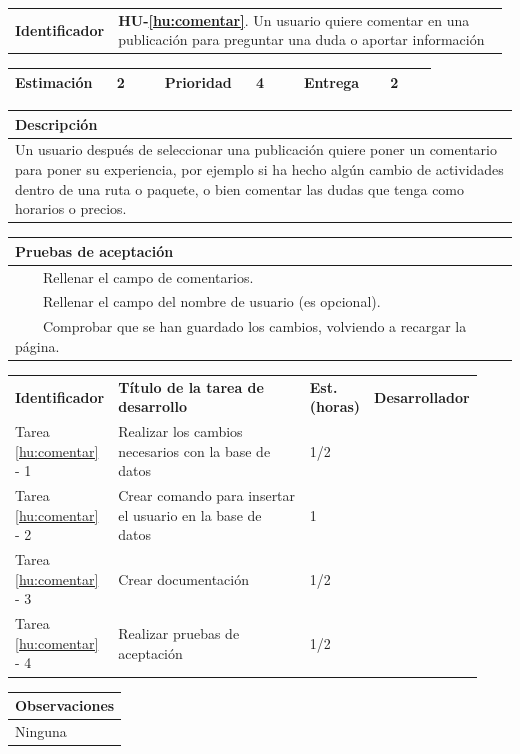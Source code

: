 \documentclass[11pt]{article}
\newcommand{\tabitem}{~~\llap{\textbullet}~~}
\begin{document}
\begin{longtable}{p{0.18\linewidth}|p{0.8\linewidth}}
  \rowcolor{LightCyan}
  \textbf{Identificador} & \textbf{HU-\ref{hu:comentar}}. Un usuario quiere comentar en una publicación para preguntar una duda o aportar información \\  
\end{longtable}
\vspace{-0.8cm}
\begin{longtable}{p{0.18\linewidth}|p{0.1\linewidth}|p{0.18\linewidth}|p{0.1\linewidth}|p{0.18\linewidth}|p{0.1\linewidth}}
  \toprule
  \textbf{Estimación} & 2 & \textbf{Prioridad} & 4 & \textbf{Entrega} & 2 \\
  \bottomrule
\end{longtable}
\vspace{-0.8cm}
\begin{longtable}{p{1.028\linewidth}}
  \textbf{Descripción}\\
  \midrule
  Un usuario después de seleccionar una publicación quiere poner un comentario para poner su experiencia, por ejemplo si ha hecho algún cambio de actividades dentro de una ruta o paquete, o bien comentar las dudas que tenga como horarios o precios. \\
  \bottomrule
\end{longtable}
\vspace{-0.8cm}
\begin{longtable}{p{1.028\linewidth}}
  \textbf{Pruebas de aceptación}\\
  \midrule
  \tabitem Rellenar el campo de comentarios.\\
  \tabitem Rellenar el campo del nombre de usuario (es opcional).\\
  \tabitem Comprobar que se han guardado los cambios, volviendo a recargar la página.\\
\end{longtable}
\vspace{-0.8cm}
\begin{longtable}{p{0.18\linewidth}|p{0.48\linewidth}|p{0.1\linewidth}|p{0.17\linewidth}}
  \toprule
  \textbf{Identificador} & \textbf{Título de la tarea de desarrollo} & \textbf{Est. (horas)} & \textbf{Desarrollador} \\
  Tarea \ref{hu:comentar} - 1 & Realizar los cambios necesarios con la base de datos & 1/2 &\\
  Tarea \ref{hu:comentar} - 2 & Crear comando para insertar el usuario en la base de datos & 1 & \\
  Tarea \ref{hu:comentar} - 3 & Crear documentación & 1/2 & \\
  Tarea \ref{hu:comentar} - 4 & Realizar pruebas de aceptación & 1/2 &  \\
  \bottomrule
\end{longtable}
\vspace{-0.8cm}
\begin{longtable}{p{1.028\linewidth}}
  \textbf{Observaciones}\\
  \midrule
  Ninguna\\
  \bottomrule
\end{longtable}
\end{document}
